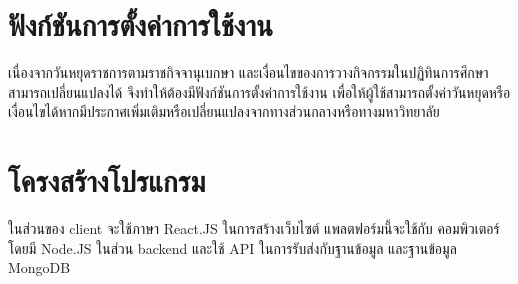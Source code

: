 \section{ฟังก์ชันการตั้งค่าการใช้งาน}
เนื่องจากวันหยุดราชการตามราชกิจจานุเบกษา และเงื่อนไขของการวางกิจกรรมในปฏิทินการศึกษาสามารถเปลี่ยนแปลงได้ 
จึงทำให้ต้องมีฟังก์ชันการตั้งค่าการใช้งาน เพื่อให้ผู้ใช้สามารถตั้งค่าวันหยุดหรือเงื่อนไขได้หากมีประกาศเพิ่มเติมหรือเปลี่ยนแปลงจากทางส่วนกลางหรือทางมหาวิทยาลัย

\section{โครงสร้างโปรแกรม}
ในส่วนของ client จะใช้ภาษา React.JS ในการสร้างเว็บไซต์ แพลตฟอร์มนี้จะใช้กับ
คอมพิวเตอร์ โดยมี Node.JS ในส่วน backend และใช้ API ในการรับส่งกับฐานข้อมูล
และฐานข้อมูล MongoDB
